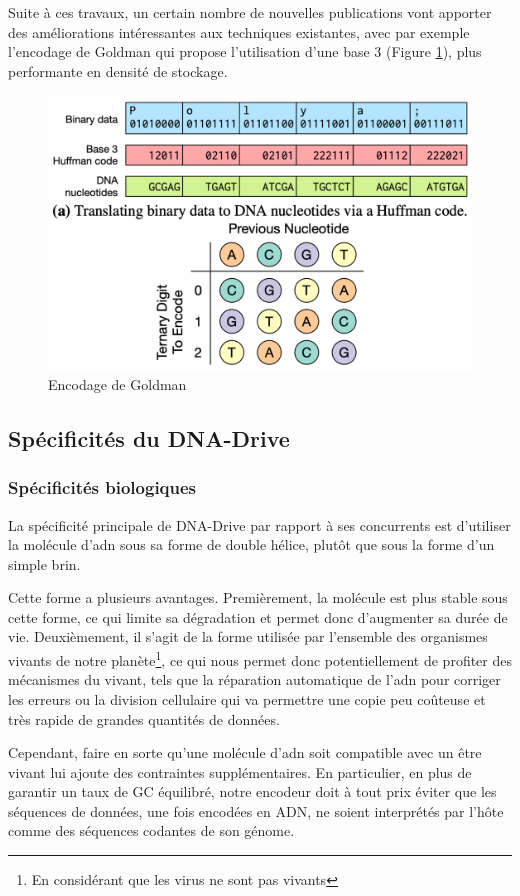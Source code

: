\documentclass[a4paper]{report}
\begin{document}
Suite à ces travaux, un certain nombre de nouvelles publications vont apporter des améliorations intéressantes aux techniques existantes,
avec par exemple l'encodage de Goldman \cite{goldman2013towards} qui propose l'utilisation d'une base 3 (Figure \ref{fig:goldman-encoding}),
plus performante en densité de stockage.

\begin{figure}[ht]
\centering
\includegraphics[width=.6\textwidth]{goldman-encoding}
\caption{Encodage de Goldman \cite{goldman2013towards}}
\label{fig:goldman-encoding}
\end{figure}


\subsection{Spécificités du DNA-Drive}

\subsubsection{Spécificités biologiques}

La spécificité principale de DNA-Drive par rapport à ses concurrents est d'utiliser la molécule d'\ac{adn} sous sa forme de double hélice, plutôt que sous la forme d'un simple brin.

Cette forme a plusieurs avantages.
Premièrement, la molécule est plus stable sous cette forme, ce qui limite sa dégradation et permet donc d'augmenter sa durée de vie.
Deuxièmement, il s'agit de la forme utilisée par l'ensemble des organismes vivants de notre planète\footnote{En considérant que les virus ne sont pas vivants},
ce qui nous permet donc potentiellement de profiter des mécanismes du vivant,
tels que la réparation automatique de l’\ac{adn} pour corriger les erreurs
ou la division cellulaire qui va permettre une copie peu coûteuse et très rapide de grandes quantités de données.

Cependant, faire en sorte qu'une molécule d'\ac{adn} soit compatible avec un être vivant lui ajoute des contraintes supplémentaires.
En particulier, en plus de garantir un taux de GC équilibré,
notre encodeur doit à tout prix éviter que les séquences de données, une fois encodées en ADN,
ne soient interprétés par l'hôte comme des séquences codantes de son génome.
\end{document}
